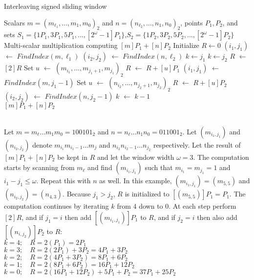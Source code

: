 \begin{algorithm}
\caption{Interleaving signed sliding window}
\begin{algorithmic}
	\Require Scalars $m={(m_{\ell_1},\dots,m_1,m_0)}_2$ and $n={(n_{\ell_2},\dots,n_1,n_0)}_2$,
		points $P_1,P_2$, and sets $S_1=\{1P_1,3P_1,5P_1,\dots,[2^{\omega}-1]P_1\}$,$S_2=\{1P_2,3P_2,5P_2,\dots,[2^{\omega}-1]P_2\}$
	\Ensure Multi-scalar multiplication computing $[m]P_1 + [n]P_2$
	\Statex
	\State Initialize $R \gets 0$
	\State $(i_1,j_1)$ $\gets$ $FindIndex(m,\ell_1)$		
	\State $(i_2,j_2)$ $\gets$ $FindIndex(n,\ell_2)$		
	 \State $k \gets j_1$
	\Else \State $k \gets j_2$
	\EndIf
		\State $R$ $\gets$ $[2]R$
			\State Set $u$ $\gets$ ${(m_{i_1},\dots,m_{j_1+1},m_{j_1})}_2$
			\State $R$ $\gets$ $R + [u]P_1$		
			\State $(i_1,j_1)$ $\gets$ $FindIndex(m,j_1{-}1)$
		\EndIf
			\State Set $u$ $\gets$ ${(n_{i_2},\dots,n_{j_2+1},n_{j_2})}_2$
			\State $R$ $\gets$ $R + [u]P_2$		
			\State $(i_2,j_2)$ $\gets$ $FindIndex(n,j_2{-}1)$
		\EndIf
		\State $k$ $\gets$ $k - 1$
	\EndWhile
	\\ \Return $[m]P_1 + [n]P_2$
\end{algorithmic}
\label{interleaveSlidingAlgo}
\end{algorithm}

 \\
Let $m = m_\ell \dots m_1 m_0 = {100101}_2$ and $n = n_\ell \dots n_1 n_0 = {011001}_2$.
Let $(m_{i_1,j_1})$ and $(n_{i_2,j_2})$ denote $m_{i_1} m_{i_1-1} \dots m_{j}$ and $n_{i_2} n_{i_2-1} \dots n_{j_2}$ respectively.
Let the result of $[m]P_1 + [n]P_2$ be kept in $R$ and let the window width $\omega = 3$.
The computation starts by scanning from $m_\ell$ and find $(m_{i_1,j_1})$ such that $m_{i_1} = m_{j_1} = 1$ and $i_1 - j_1 \le \omega$.
Repeat this with $n$ as well.
In this example, $(m_{i_1,j_1}) = (m_{5,5})$ and $(n_{i_2,j_2}) = (n_{4,3})$.
Because $j_1 > j_2$, $R$ is initialized to $[(m_{5,5})]P_1 = P_1$.
The computation continues by iterating $k$ from $4$ down to $0$.
At each step perform $[2]R$, and if $j_1 = i$ then add $[(m_{i_1,j_1})]P_1$ to $R$, and if $j_2 = i$ then also add $[(n_{i,j_2})]P_2$ to $R$: \\
$k=4; \quad R = 2(P_1) = 2P_1$ \\
$k=3; \quad R = 2(2P_1) + 3P_2 = 4P_1 + 3P_2$ \\
$k=2; \quad R = 2(4P_1 + 3P_2) = 8P_1 + 6P_2$ \\
$k=1; \quad R = 2(8P_1 + 6P_2) = 16P_1 + 12P_2$ \\
$k=0; \quad R = 2(16P_1 + 12P_2) + 5P_1 + P_2 = 37P_1 + 25P_2$ \\


